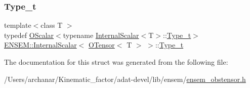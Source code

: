 \subsubsection{\texorpdfstring{Type\_t}{Type\_t}\hspace{0.1cm}{\footnotesize\ttfamily [3/3]}}
{\footnotesize\ttfamily template$<$class T $>$ \\
typedef \mbox{\hyperlink{classENSEM_1_1OScalar}{O\+Scalar}}$<$typename \mbox{\hyperlink{structENSEM_1_1InternalScalar}{Internal\+Scalar}}$<$T$>$\+::\mbox{\hyperlink{structENSEM_1_1InternalScalar_3_01OTensor_3_01T_01_4_01_4_a3f6b2482642650ffa201bbe320aaa7aa}{Type\+\_\+t}}$>$ \mbox{\hyperlink{structENSEM_1_1InternalScalar}{E\+N\+S\+E\+M\+::\+Internal\+Scalar}}$<$ \mbox{\hyperlink{classENSEM_1_1OTensor}{O\+Tensor}}$<$ T $>$ $>$\+::\mbox{\hyperlink{structENSEM_1_1InternalScalar_3_01OTensor_3_01T_01_4_01_4_a3f6b2482642650ffa201bbe320aaa7aa}{Type\+\_\+t}}}



The documentation for this struct was generated from the following file\+:\begin{DoxyCompactItemize}
\item 
/\+Users/archanar/\+Kinematic\+\_\+factor/adat-\/devel/lib/ensem/\mbox{\hyperlink{adat-devel_2lib_2ensem_2ensem__obstensor_8h}{ensem\+\_\+obstensor.\+h}}\end{DoxyCompactItemize}
